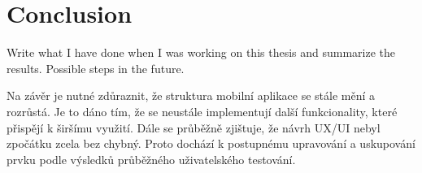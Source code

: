 \chapter{Conclusion}\label{ch:conclusion}
Write what I have done when I was working on this thesis and summarize the results.
Possible steps in the future.

Na závěr je nutné zdůraznit, že struktura mobilní aplikace se stále mění a rozrůstá.
Je to dáno tím, že se neustále implementují další funkcionality, které přispějí k širšímu využití.
Dále se průběžně zjištuje, že návrh UX/UI nebyl zpočátku zcela bez chybný.
Proto dochází k postupnému upravování a uskupování prvku podle výsledků průběžného uživatelského testování.